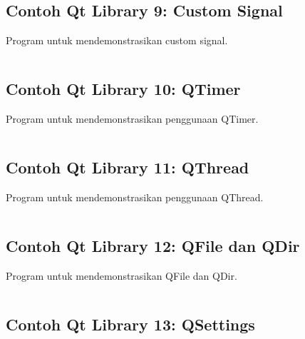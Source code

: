 \subsection{Contoh Qt Library 9: Custom Signal}

Program untuk mendemonstrasikan custom signal.

\begin{lstlisting}[language=c++, caption=Custom Signal]

\end{lstlisting}

\subsection{Contoh Qt Library 10: QTimer}

Program untuk mendemonstrasikan penggunaan QTimer.

\begin{lstlisting}[language=c++, caption=QTimer]

\end{lstlisting}

\subsection{Contoh Qt Library 11: QThread}

Program untuk mendemonstrasikan penggunaan QThread.

\begin{lstlisting}[language=c++, caption=QThread]

\end{lstlisting}

\subsection{Contoh Qt Library 12: QFile dan QDir}

Program untuk mendemonstrasikan QFile dan QDir.

\begin{lstlisting}[language=c++, caption=QFile dan QDir]

\end{lstlisting}

\subsection{Contoh Qt Library 13: QSettings}


